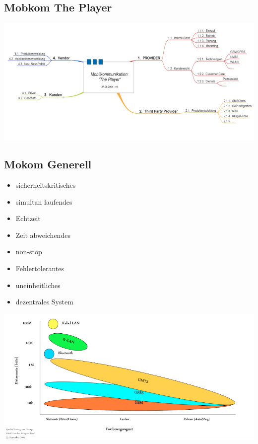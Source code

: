 \subsection{Mobkom The Player}

\includegraphics[height = 5 cm]{./Pics/MobKomThePlayer}

\subsection{Mokom Generell}
\begin{minipage}{0.5 \linewidth}
\begin{itemize}
\item sicherheitskritisches 
\item simultan laufendes
\item Echtzeit
\item Zeit abweichendes
\item non-stop
\item Fehlertolerantes
\item  uneinheitliches
\item dezentrales System
\end{itemize}
\end{minipage}
\begin{minipage}{0.5 \linewidth}
\includegraphics[width = \linewidth]{./Pics/Technologien}
\end{minipage}

